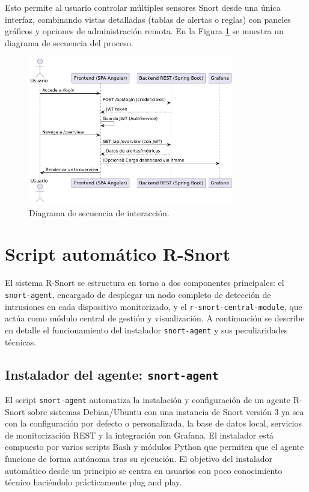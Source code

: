 \documentclass[11pt,a4paper,twoside]{report}
\begin{document}
Esto permite al usuario controlar múltiples sensores Snort desde una única interfaz, combinando vistas detalladas (tablas de alertas o reglas) con paneles gráficos y opciones de administración remota. En la Figura \ref{fig:diagrama-secuencia-frontend} se muestra un diagrama de secuencia del proceso.

\begin{figure}[htb]
	\centering
	\includegraphics[width=0.8\textwidth]{documento/28.png}
	\caption{Diagrama de secuencia de interacción.}
	\label{fig:diagrama-secuencia-frontend}
\end{figure}

\section{Script automático R-Snort}

El sistema R-Snort se estructura en torno a dos componentes principales: el \texttt{snort-agent}, encargado de desplegar un nodo completo de detección de intrusiones en cada dispositivo monitorizado, y el \texttt{r-snort-central-module}, que actúa como módulo central de gestión y visualización. A continuación se describe en detalle el funcionamiento del instalador \texttt{snort-agent} y sus peculiaridades técnicas.

\subsection{Instalador del agente: \texttt{snort-agent}}

El script \texttt{snort-agent} automatiza la instalación y configuración de un agente R-Snort sobre sistemas Debian/Ubuntu con una instancia de Snort versión 3 ya sea con la configuración por defecto o personalizada, la base de datos local, servicios de monitorización REST y la integración con Grafana. El instalador está compuesto por varios scripts Bash y módulos Python que permiten que el agente funcione de forma autónoma tras su ejecución. El objetivo del instalador automático desde un principio se centra en usuarios con poco conocimiento técnico haciéndolo prácticamente plug and play.
\end{document}
